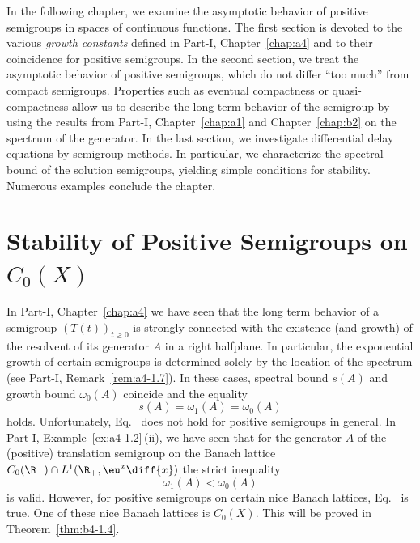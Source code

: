 \label{chap:b4}
\thispagestyle{empty}
In the following chapter, we examine the asymptotic behavior%
of positive semigroups in spaces of continuous functions.
The first section is devoted to the various \emph{growth constants} defined in Part-I, Chapter~\ref{chap:a4} and to their coincidence for positive semigroups.
In the second section, we treat the asymptotic behavior of positive semigroups, which do not differ \enquote{too much} from compact semigroups.
Properties such as eventual compactness or quasi-compactness allow us to describe the long term behavior of the semigroup by using the results from Part-I, Chapter~\ref{chap:a1} and Chapter~\ref{chap:b2} on the spectrum of the generator.
In the last section, we investigate differential delay equations by semigroup methods. 
In particular, we characterize the spectral bound of the solution semigroups, yielding simple conditions for stability. 
Numerous examples conclude the chapter.
\section{Stability of Positive Semigroups on \texorpdfstring{$C_{0}(X)$}{C\textsubscript{0}(X)}}\label{sec:b4-1}%
\hspace{1cm}{\Large by Frank Neubrander}
\vspace{.5cm}
\newline
In Part-I, Chapter~\ref{chap:a4} we have seen that the long term behavior of a semigroup $(T(t))_{t \geq 0}$ is strongly connected with the existence (and growth) of the resolvent of its generator $A$ in a right halfplane.
In particular, the exponential growth of certain semigroups is determined solely by the location of the spectrum (see Part-I, Remark~\ref{rem:a4-1.7}).
In these cases, spectral bound%
$s(A)$ and growth bound%
$\omega_{0}(A)$ coincide and the equality
\begin{equation}\label{eq:b4-1.1}
   s(A) = \omega_1(A) = \omega_{0}(A)
\end{equation}
holds.
Unfortunately, Eq.~ does not hold for positive semigroups in general.
In Part-I, Example~\ref{ex:a4-1.2}\,(ii), we have seen that for the generator $A$ of the (positive) translation semigroup on the Banach lattice $C_{0}(\R_+) \cap L^1(\R_+,\eu^x \diff{x})$ the strict inequality 
\[
\omega_1(A) < \omega_{0}(A)
\]
is valid.
However, for positive semigroups on certain nice Banach lattices, Eq.~ is true.
One of these nice Banach lattices is $C_{0}(X)$. 
This will be proved in Theorem~\ref{thm:b4-1.4}.

